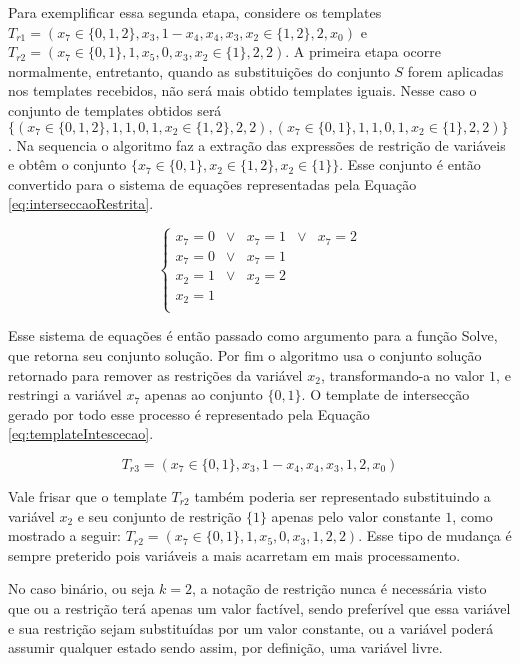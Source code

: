 Para exemplificar essa segunda etapa, considere os templates $T_{r1} = (x_7 \in \{0,1,2\},x_3,1-x_4,x_4,x_3,x_2 \in \{1,2\},2,x_0)$ e $T_{r2} = (x_7 \in \{0,1\},1,x_5,0,x_3,x_2 \in \{1\},2,2)$. A primeira etapa ocorre normalmente, entretanto, quando as substituições do conjunto $S$ forem aplicadas nos templates recebidos, não será mais obtido templates iguais. Nesse caso o conjunto de templates obtidos será $\{(x_7 \in \{0,1,2\}, 1, 1, 0, 1, x_2 \in \{1,2\}, 2, 2), (x_7 \in \{0,1\}, 1, 1, 0, 1, x_2 \in \{1\}, 2, 2)\}$. Na sequencia o algoritmo faz a extração das expressões de restrição de variáveis e obtêm o conjunto $\{x_7 \in \{0,1\}, x_2 \in \{1,2\}, x_2 \in \{1\} \}$. Esse conjunto é então convertido para o sistema de equações representadas pela Equação \ref{eq:interseccaoRestrita}.

\begin{equation}
\left\{\begin{matrix}
x_7	  = 0 	& \vee &	x_7	=	1 & \vee &	x_7	= 2	\\ 
x_7   = 0 	& \vee &	x_7	=	1					\\ 
x_2   = 1 	& \vee &	x_2	=	2					\\ 
x_2	  =	1											\\ 
\end{matrix}\right.
\label{eq:interseccaoRestrita}
\end{equation}

Esse sistema de equações é então passado como argumento para a função Solve, que retorna seu conjunto solução. Por fim o algoritmo usa o conjunto solução retornado para remover as restrições da variável $x_2$, transformando-a no valor $1$, e restringi a variável $x_7$ apenas ao conjunto $\{0,1\}$. O template de intersecção gerado por todo esse processo é representado pela Equação \ref{eq:templateIntescecao}.

\begin{equation}
T_{r3} = (x_7 \in \{0,1\}, x_3, 1-x_4, x_4, x_3, 1, 2, x_0)
\label{eq:templateIntescecao}
\end{equation}

Vale frisar que o template $T_{r2}$ também poderia ser representado substituindo a variável $x_2$ e seu conjunto de restrição $\{1\}$ apenas pelo valor constante $1$, como mostrado a seguir: $T_{r2} = (x_7 \in \{0,1\}, 1, x_5, 0, x_3, 1, 2, 2)$. Esse tipo de mudança é sempre preterido pois variáveis a mais acarretam em mais processamento.

No caso binário, ou seja $k = 2$, a notação de restrição nunca é necessária visto que ou a restrição terá apenas um valor factível, sendo preferível que essa variável e sua restrição sejam substituídas por um valor constante, ou a variável poderá assumir qualquer estado sendo assim, por definição, uma variável livre.